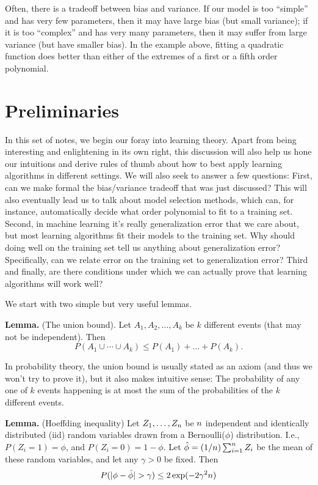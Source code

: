 \documentclass{article} %
\begin{document}
Often, there is a tradeoff between bias and variance.
If our model is too ``simple'' and has very few parameters, then it may have large
bias (but small variance); if it is too ``complex'' and has very many parameters,
then it may suffer from large variance (but have smaller bias).  In the example above,
fitting a quadratic function does better than either of the extremes of a first
or a fifth order polynomial.

\section{Preliminaries}

In this set of notes, we begin our foray into learning theory.  Apart from being
interesting and enlightening in its own right, this discussion will also help us
hone our intuitions and derive rules of thumb about how to best apply learning algorithms
in different settings.  We will also seek to answer a few questions:  First, can we
make formal the bias/variance tradeoff that was just discussed?
This will also eventually lead us to talk about model selection methods, which can,
for instance, automatically decide what order polynomial to fit to a training set.
Second, in machine learning it's really generalization error
that we care about, but most learning algorithms fit their models
to the training set. Why should doing well on the training set tell us anything
about generalization error?  Specifically, can we relate error on the training
set to generalization error?  Third and finally, are there conditions under
which we can actually prove that learning algorithms will work well?

We start with two simple but very useful lemmas.

\medskip
\noindent
{\bf Lemma.} (The union bound).  Let $A_1, A_2, \ldots, A_k$ be $k$ different
events (that may not be independent).  Then
\[
P(A_1 \cup \cdots \cup A_k) \leq P(A_1) + \ldots + P(A_k).
\]

In probability theory, the union bound is usually stated as an axiom
(and thus we won't try to prove it), but it also makes intuitive sense: The probability of
any one of $k$ events happening is at most the sum of the probabilities of the $k$
different events.

\medskip
\noindent
{\bf Lemma.} (Hoeffding inequality)  Let $Z_1, \ldots, Z_{{n}}$ be ${n}$
independent and identically distributed (iid) random variables drawn from
a Bernoulli($\phi$) distribution.  I.e., $P(Z_i = 1) = \phi$, and $P(Z_i=0) = 1-\phi$.
Let $\hat\phi = (1/{n}) \sum_{i=1}^{n} Z_i$ be the mean of these random variables,
and let any $\gamma > 0$ be fixed.  Then
\[
P(|\phi - \hat\phi| > \gamma) \leq 2 \exp(-2\gamma^2 {n})
\]
\end{document}

